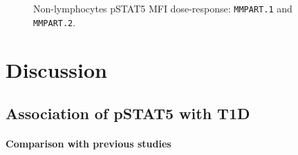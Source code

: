 \begin{figure}
\begin{minipage}{.5\textwidth}
\end{minipage}
\begin{minipage}{.3\textwidth}
{ Non-lymphocytes pSTAT5 MFI dose-response: \texttt{MMPART.1} and \texttt{MMPART.2}. }
{ }
\end{minipage}
\end{figure}

\clearpage


\section{Discussion}

\subsection{Association of pSTAT5 with T1D}

\paragraph{Comparison with previous studies}

